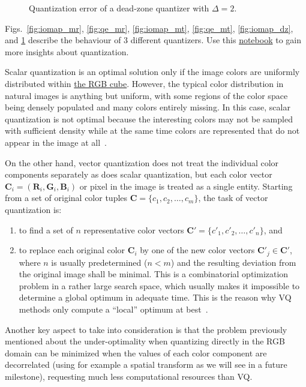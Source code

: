\begin{figure}
  \centering
  \caption{Quantization error of a dead-zone quantizer with $\Delta=2$.}
  \label{fig:qe_dz}
\end{figure}

Figs.~\ref{fig:iomap_mr}, \ref{fig:qe_mr}, \ref{fig:iomap_mt},
\ref{fig:qe_mt}, \ref{fig:iomap_dz}, and \ref{fig:qe_dz} describe the
behaviour of 3 different quantizers.  Use this
\href{https://github.com/Sistemas-Multimedia/Sistemas-Multimedia.github.io/blob/master/milestones/05-quantization/digital_quantization.ipynb}{notebook}
to gain more insights about quantization.

Scalar quantization is an optimal solution only if the image colors
are uniformly distributed within
\href{https://en.wikipedia.org/wiki/RGB_color_model}{the RGB
  cube}. However, the typical color distribution in natural images is
anything but uniform, with some regions of the color space being
densely populated and many colors entirely missing. In this case,
scalar quantization is not optimal because the interesting colors may
not be sampled with suﬃcient density while at the same time colors are
represented that do not appear in the image at
all~\cite{burger2016digital}.

On the other hand, vector quantization does not treat the individual
color components separately as does scalar quantization, but each
color vector
${\mathbf C}_i = ({\mathbf R}_i, {\mathbf G}_i, {\mathbf B}_i )$ or
pixel in the image is treated as a single entity. Starting from a set
of original color tuples ${\mathbf C} = \{c_1, c_2, \ldots ,c_m\}$,
the task of vector quantization is:
\begin{enumerate}
\item to ﬁnd a set of $n$ representative color vectors
  ${\mathbf C}' = \{c'_1, c'_2 ,\ldots , c'_n \}$, and
\item to replace each original color ${\mathbf C}_i$ by one of the new
  color vectors ${\mathbf C}'_j\in {\mathbf C}'$, where $n$ is usually
  predetermined ($n < m$) and the resulting deviation from the
  original image shall be minimal. This is a combinatorial
  optimization problem in a rather large search space, which usually
  makes it impossible to determine a global optimum in adequate
  time. This is the reason why VQ methods only compute a ``local''
  optimum at best~\cite{burger2016digital}.
\end{enumerate}

Another key aspect to take into consideration is that the problem
previously mentioned about the under-optimality when quantizing directly
in the RGB domain can be minimized when the values of each color
component are decorrelated (using for example a spatial transform as
we will see in a future milestone), requesting much less computational
resources than VQ.

